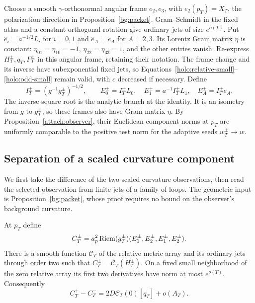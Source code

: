 Choose a smooth $\gamma$-orthonormal angular frame $e_2,e_3$, with
$e_2(p_T)=X_T$, the polarization direction in
Proposition~\ref{bg:packet}.  Gram--Schmidt in the fixed atlas and a
constant orthogonal rotation give ordinary jets of size $e^{o(T)}$.
Put $\hat e_i=a^{-1/2}L_i$ for $i=0,1$ and $\hat e_A=e_A$ for
$A=2,3$.  Its Lorentz Gram matrix $\eta$ is constant:
$\eta_{01}=\eta_{10}=-1$, $\eta_{22}=\eta_{33}=1$, and the other
entries vanish.  Re-express $H_T^\pm,q_T,F_T^\pm$ in this angular
frame, retaining their notation.  The frame change and its inverse
have subexponential fixed jets, so
Equations~\eqref{holo:relative-small}--\eqref{holo:odd-small}
remain valid, with $c$ decreased if necessary.  Define
\begin{equation}\label{holo:frames}
 I_T^\pm=(g^{-1}g_T^\pm)^{-1/2},\qquad
 E_0^\pm=I_T^\pm L_0,\quad
 E_1^\pm=a^{-1}I_T^\pm L_1,\quad
 E_A^\pm=I_T^\pm e_A.
\end{equation}
The inverse square root is the analytic branch at the identity.
It is an isometry from $g$ to $g_T^\pm$, so these frames also have
Gram matrix $\eta$.  By Proposition~\ref{attach:observer}, their
Euclidean component norms at $p_T$ are uniformly comparable to the
positive test norm for the adaptive seeds $w_T^\pm\to w$.

\subsection{Separation of a scaled curvature component}

We first take the difference of the two scaled curvature observations,
then read the selected observation from finite jets of a family of loops.
The geometric input is Proposition~\ref{bg:packet}, whose proof requires
no bound on the observer's background curvature.

\begin{lemma}
\label{holo:curvature-functional}
At $p_T$ define
\begin{equation}\label{holo:scaled-curvature}
 C_T^\pm=a_p^2\operatorname{Riem}(g_T^\pm)
       (E_1^\pm,E_2^\pm,E_1^\pm,E_2^\pm).
\end{equation}
There is a smooth function $\mathcal C_T$ of the relative metric
array and its ordinary jets through order two such that
$C_T^\pm=\mathcal C_T(H_T^\pm)$.  On a fixed small neighborhood
of the zero relative array its first two derivatives have norm
at most $e^{o(T)}$.  Consequently
\begin{equation}\label{holo:signed-taylor}
 C_T^+-C_T^-=2D\mathcal C_T(0)[q_T]+o(A_T).
\end{equation}
\end{lemma}

